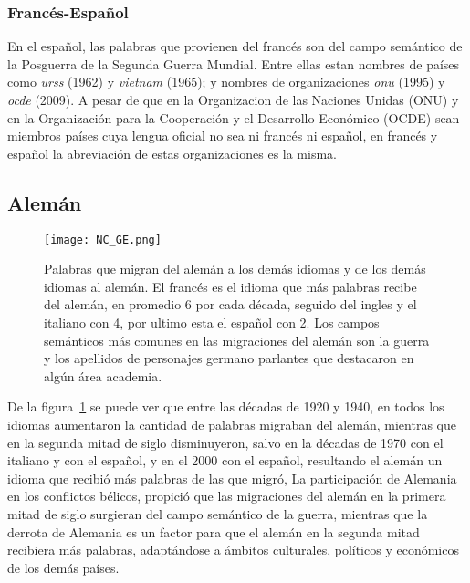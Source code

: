 \subsubsection*{Francés-Español}%


En el español, las palabras que provienen del francés son del campo semántico de la Posguerra de la Segunda Guerra Mundial. Entre ellas estan nombres de países como \textit{urss} (1962) y \textit{vietnam} (1965); y nombres de organizaciones \textit{onu} (1995) y  \textit{ocde} (2009). A pesar de que en la Organizacion de las Naciones Unidas (ONU) y en la Organización para la Cooperación y el Desarrollo Económico (OCDE) sean miembros países cuya lengua oficial no sea ni francés ni español,  en francés y español la abreviación de estas organizaciones es la misma.  

%




\subsection{Alemán}%

\begin{figure}[h!]
	\centering
	\texttt{[image: NC\_GE.png]}
	\caption{Palabras que migran del alemán a los demás idiomas y de los demás idiomas al alemán. El francés es el idioma que más palabras recibe del alemán,  en promedio 6 por cada década,  seguido del ingles y el italiano con 4,  por ultimo esta el español con 2. Los campos semánticos más comunes en las migraciones del alemán son la guerra  y  los apellidos  de personajes germano parlantes que destacaron en algún área academia.}  
	\label{fig.NC_GE}
\end{figure}



De la figura~\ref{fig.NC_GE} se puede ver que entre las décadas de 1920 y 1940, en todos los idiomas aumentaron la cantidad de palabras migraban del alemán, mientras que en la segunda mitad de siglo disminuyeron, salvo en la décadas de 1970 con el italiano y con el español, y en el 2000 con el español, resultando el alemán un idioma que recibió más palabras de las que migró,  La participación de Alemania en los conflictos bélicos, propició que las migraciones del alemán en la primera mitad de siglo surgieran del campo semántico de la guerra, mientras que la derrota de Alemania es un factor para que el alemán en la segunda mitad recibiera más palabras, adaptándose a ámbitos culturales, políticos y económicos de los demás países. 

